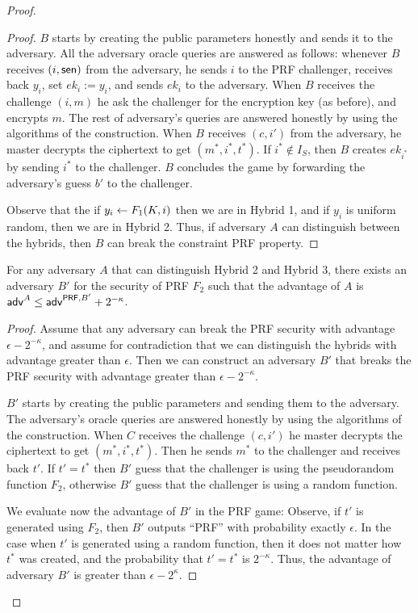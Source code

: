 \documentclass{llncs}
\begin{document}
\begin{proof}
\begin{proof}
$B$ starts by creating the public parameters honestly and sends it to the adversary. 
All the adversary oracle queries are answered as follows: whenever $B$ receives $(i,\mathsf{sen})$ from the adversary, he sends $i$ to the PRF challenger, receives back $y_i$, set $ek_i := y_i$, and sends $ek_i$ to the adversary. 
When $B$ receives the challenge $(i,m)$ he ask the challenger for the encryption key (as before), and encrypts $m$. The rest of adversary's queries are answered honestly by using the algorithms of the construction.
When $B$ receives $(c,i')$ from the adversary, he master decrypts the ciphertext to get $(m^*,i^*,t^*)$. If $i^* \notin I_S$, then $B$ creates $ek_{i^*}$ by sending $i^*$ to the challenger.
$B$ concludes the game by forwarding the adversary's guess $b'$ to the challenger.

Observe that the if $y_i \leftarrow F_1(K,i)$ then we are in Hybrid 1, and if $y_i$ is uniform random, then we are in Hybrid 2. 
Thus, if adversary $A$ can distinguish between the hybrids, then $B$ can break the constraint PRF property. 
\end{proof}


\begin{claim} 
For any adversary $A$ that can distinguish Hybrid 2 and Hybrid 3,
there exists an adversary $B'$ for the security of PRF $F_2$ such that the advantage of $A$ is 
$ \mathsf{adv}^{A} \leq \mathsf{adv}^{\mathsf{PRF},B'} + 2^{-\kappa}$.
\end{claim}

\begin{proof}
Assume that any adversary can break the PRF security with advantage $\epsilon - 2^{-\kappa}$, and assume for contradiction that we can distinguish the hybrids with advantage greater than $\epsilon$. Then we can construct an adversary $B'$ that breaks the PRF security with advantage greater than $\epsilon - 2^{-\kappa}$.

$B'$ starts by creating the public parameters and sending them to the adversary. The adversary's oracle queries are answered honestly by using the algorithms of the construction.
When $C$ receives the challenge $(c,i')$ he master decrypts the ciphertext to get $(m^*,i^*,t^*)$. Then he sends $m^*$ to the challenger and receives back $t'$. If $t' = t^*$ then $B'$ guess that the challenger is using the pseudorandom function $F_2$, otherwise $B'$ guess that the challenger is using a random function.

We evaluate now the advantage of $B'$ in the PRF game: Observe, if $t'$ is generated using $F_2$, then $B'$ outputs ``PRF'' with probability exactly $\epsilon$. In the case when $t'$ is generated using a random function, then it does not matter how $t^*$ was created, and the probability that $t' = t^*$ is $2^{-\kappa}$. Thus, the advantage of adversary $B'$ is greater than $\epsilon - 2^\kappa$.
\end{proof}



\end{proof}
\end{document}

